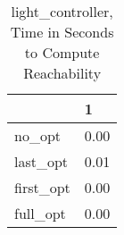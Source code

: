 \begin{table}
\caption{light\_controller, Time in Seconds to Compute Reachability}
\label{light_controller_states_time}
\begin{tabular}{ll}
\toprule
 & 1 \\
\midrule
no\_opt & 0.00 \\
last\_opt & 0.01 \\
first\_opt & 0.00 \\
full\_opt & 0.00 \\
\bottomrule
\end{tabular}
\end{table}
